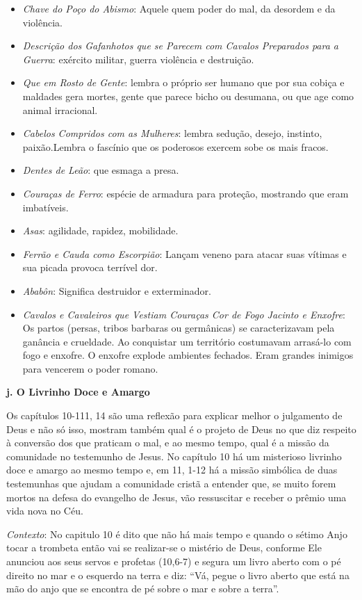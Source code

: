 \documentclass[
]{book}
\begin{document}
\begin{itemize}
\item
  \emph{Chave do Poço do Abismo}: Aquele quem poder do mal, da desordem e da violência.
\item
  \emph{Descrição dos Gafanhotos que se Parecem com Cavalos Preparados para a Guerra}: exército militar, guerra violência e destruição.
\item
  \emph{Que em Rosto de Gente}: lembra o próprio ser humano que por sua cobiça e maldades gera mortes, gente que parece bicho ou desumana, ou que age como animal irracional.
\item
  \emph{Cabelos Compridos com as Mulheres}: lembra sedução, desejo, instinto, paixão.Lembra o fascínio que os poderosos exercem sobe os mais fracos.
\item
  \emph{Dentes de Leão}: que esmaga a presa.
\item
  \emph{Couraças de Ferro}: espécie de armadura para proteção, mostrando que eram imbatíveis.
\item
  \emph{Asas}: agilidade, rapidez, mobilidade.
\item
  \emph{Ferrão e Cauda como Escorpião}: Lançam veneno para atacar suas vítimas e sua picada provoca terrível dor.
\item
  \emph{Ababôn}: Significa destruidor e exterminador.
\item
  \emph{Cavalos e Cavaleiros que Vestiam Couraças Cor de Fogo Jacinto e Enxofre}: Os partos (persas, tribos barbaras ou germânicas) se caracterizavam pela ganância e crueldade. Ao conquistar um território costumavam arrasá-lo com fogo e enxofre. O enxofre explode ambientes fechados. Eram grandes inimigos para vencerem o poder romano.
\end{itemize}

\textbf{j. O Livrinho Doce e Amargo}

Os capítulos 10-111, 14 são uma reflexão para explicar melhor o julgamento de Deus e não só isso, mostram também qual é o projeto de Deus no que diz respeito à conversão dos que praticam o mal, e ao mesmo tempo, qual é a missão da comunidade no testemunho de Jesus. No capítulo 10 há um misterioso livrinho doce e amargo ao mesmo tempo e, em 11, 1-12 há a missão simbólica de duas testemunhas que ajudam a comunidade cristã a entender que, se muito forem mortos na defesa do evangelho de Jesus, vão ressuscitar e receber o prêmio uma vida nova no Céu.

\emph{Contexto}: No capitulo 10 é dito que não há mais tempo e quando o sétimo Anjo tocar a trombeta então vai se realizar-se o mistério de Deus, conforme Ele anunciou aos seus servos e profetas (10,6-7) e segura um livro aberto com o pé direito no mar e o esquerdo na terra e diz: ``Vá, pegue o livro aberto que está na mão do anjo que se encontra de pé sobre o mar e sobre a terra''.
\end{document}
